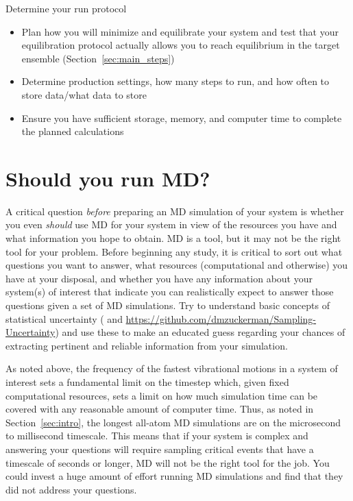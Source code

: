 \documentclass[9pt,bestpractices]{livecoms}
\begin{document}
\begin{Checklists*}[p!]
\begin{checklist}{Determine your run protocol}
\begin{itemize}
\item Plan how you will minimize and equilibrate your system and test that your equilibration protocol actually allows you to reach equilibrium in the target ensemble (Section~\ref{sec:main_steps})
\item Determine production settings, how many steps to run, and how often to store data/what data to store
\item Ensure you have sufficient storage, memory, and computer time to complete the planned calculations
\end{itemize}
\end{checklist}


\end{Checklists*}

\section{Should you run MD?}

A critical question \emph{before} preparing an MD simulation of your system is whether you even \emph{should} use MD for your system in view of the resources you have and what information you hope to obtain.
MD is a tool, but it may not be the right tool for your problem.
Before beginning any study, it is critical to sort out what questions you want to answer, what resources (computational and otherwise) you have at your disposal, and whether you have any information about your system(s) of interest that indicate you can realistically expect to answer those questions given a set of MD simulations.
Try to understand basic concepts of statistical uncertainty (\cite{Grossfield:2009:AnnuRepComputChem} and \url{https://github.com/dmzuckerman/Sampling-Uncertainty}) and use these to make an educated guess regarding your chances of extracting pertinent and reliable information from your simulation.

As noted above, the frequency of the fastest vibrational motions in a system of interest sets a fundamental limit on the timestep which, given fixed computational resources, sets a limit on how much simulation time can be covered with any reasonable amount of computer time.
Thus, as noted in Section~\ref{sec:intro}, the longest all-atom MD simulations are on the microsecond to millisecond timescale.
This means that if your system is complex and answering your questions will require sampling critical events that have a timescale of seconds or longer, MD will not be the right tool for the job.
You could invest a huge amount of effort running MD simulations and find that they did not address your questions.
\end{document}
